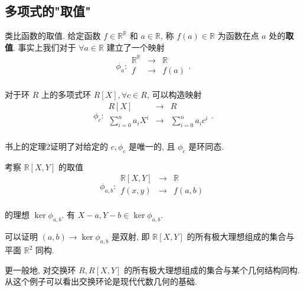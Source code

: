 \documentclass[UTF8]{ctexart}
\begin{document}
\subsection{多项式的"取值"}
类比函数的取值. 给定函数 $f\in\mathbb{R}^\mathbb{R}$ 和 $a\in\mathbb{R}$, 称 $f(a)\in\mathbb{R}$ 为函数在点 $a$ 处的\textbf{取值}. 事实上我们对于 $\forall a\in\mathbb{R}$ 建立了一个映射
\[\phi_a:\begin{array}{rcl}
    \mathbb{R}^\mathbb{R} & \to & \mathbb{R} \\
    f & \to & f(a) \\
\end{array}.\]

对于环 $R$ 上的多项式环 $R[X],\forall c\in R$, 可以构造映射
\[\phi_c:\begin{array}{rcl}
    R[X] & \to & R \\
    \sum\limits_{i=0}^{n}a_iX^i & \to & \sum\limits_{i=0}^{n}a_ic^i \\
\end{array}.\]

书上的定理2证明了对给定的 $c,\phi_c$ 是唯一的, 且 $\phi_c$ 是环同态.
\begin{example}
    考察 $\mathbb{R}[X,Y]$ 的取值
    \[\phi_{a,b}:\begin{array}{rcl}
        \mathbb{R}[X,Y] & \to & \mathbb{R} \\
        f(x,y) & \to & f(a,b) \\
    \end{array}\]

    的理想 $\ker\phi_{a,b}$. 有 $X-a,Y-b\in\ker\phi_{a,b}$.

    可以证明 $(a,b)\to\ker\phi_{a,b}$ 是双射, 即 $\mathbb{R}[X,Y]$ 的所有极大理想组成的集合与平面 $\mathbb{R}^2$ 同构.

    更一般地, 对交换环 $R,R[X,Y]$ 的所有极大理想组成的集合与某个几何结构同构. 从这个例子可以看出交换环论是现代代数几何的基础.
\end{example}
\end{document}
